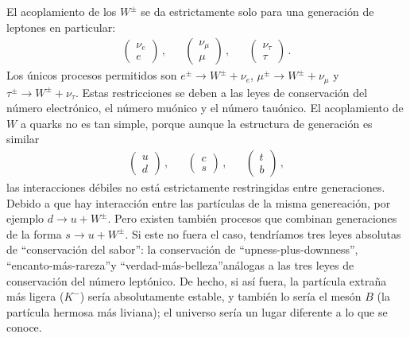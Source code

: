 El acoplamiento de los $W^{\pm}$ se da estrictamente solo para una generación de leptones en particular:
%
\begin{align*}
\begin{pmatrix}\nu_e \\ e \end{pmatrix} \,, &
&\begin{pmatrix}\nu_\mu \\ \mu \end{pmatrix} \,, &
&\begin{pmatrix}\nu_\tau \\ \tau \end{pmatrix} \,.
\end{align*}
%
Los únicos procesos permitidos son $e^{\pm} \to W^{\pm} + \nu_e$, $\mu^{\pm} \to W^{\pm} + \nu_\mu$ y $\tau^{\pm} \to W^{\pm} + \nu_\tau$. Estas restricciones se deben a las leyes de conservación del número electrónico, el número muónico y el número tauónico. El acoplamiento de $W$ a quarks no es tan simple, porque aunque la estructura de generación es similar
%
\begin{align*}
\begin{pmatrix}u \\ d \end{pmatrix}\,, & 
&\begin{pmatrix}c \\ s \end{pmatrix}\,, &
&\begin{pmatrix}t \\ b \end{pmatrix}\,,
\end{align*}
%
las interacciones débiles no está estrictamente restringidas entre generaciones. Debido a que hay interacción entre las partículas de la misma genereación, por ejemplo $d \to u + W^{\pm}$. Pero existen también procesos que combinan generaciones de la forma $s \to u + W^{\pm}$. Si este no fuera el caso, tendríamos tres leyes absolutas de \textquotedblleft conservación del sabor\textquotedblright: la conservación de \textquotedblleft upness-plus-downness\textquotedblright, \textquotedblleft encanto-más-rareza\textquotedblright y \textquotedblleft verdad-más-belleza\textquotedblright análogas a las tres leyes de conservación del número leptónico. De hecho, si así fuera, la partícula extraña más ligera ($K^-$) sería absolutamente estable, y también lo sería el mesón $B$ (la partícula hermosa más liviana); el universo sería un lugar diferente a lo que se conoce.

